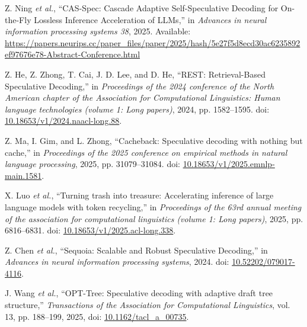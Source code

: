\documentclass[11pt,a4paper,UTF8,fontset=none,scheme=plain,zihao=-4]{ctexart}
\newenvironment{CSLReferences}[2]{%
  \footnotesize
  \raggedright
  \setlength{\leftskip}{3em}%
  \setlength{\parindent}{-3em}%
  \setlength{\parskip}{0.1\baselineskip}%
  \sloppy
}{}
\newcommand{\CSLLeftMargin}[1]{\makebox[3em][l]{#1}}
\newcommand{\CSLRightInline}[1]{#1}
\begin{document}
\begin{CSLReferences}{0}{0}
\leavevmode{}%
\CSLLeftMargin{{[}31{]} }
\CSLRightInline{Z. Ning \emph{et al.}, {``{CAS-Spec: Cascade Adaptive
Self-Speculative Decoding for On-the-Fly Lossless Inference Acceleration
of LLMs},''} in \emph{Advances in neural information processing systems
38}, 2025. Available:
\url{https://papers.neurips.cc/paper_files/paper/2025/hash/5e27f5d8ecd30ac6235892ef97676e78-Abstract-Conference.html}}

\leavevmode{}%
\CSLLeftMargin{{[}32{]} }
\CSLRightInline{Z. He, Z. Zhong, T. Cai, J. D. Lee, and D. He, {``{REST:
Retrieval-Based Speculative Decoding},''} in \emph{Proceedings of the
2024 conference of the {N}orth {A}merican chapter of the {A}ssociation
for {C}omputational {L}inguistics: Human language technologies (volume
1: Long papers)}, 2024, pp. 1582--1595. doi:
\href{https://doi.org/10.18653/v1/2024.naacl-long.88}{10.18653/v1/2024.naacl-long.88}.}

\leavevmode{}%
\CSLLeftMargin{{[}33{]} }
\CSLRightInline{Z. Ma, I. Gim, and L. Zhong, {``Cacheback: Speculative
decoding with nothing but cache,''} in \emph{Proceedings of the 2025
conference on empirical methods in natural language processing}, 2025,
pp. 31079--31084. doi:
\href{https://doi.org/10.18653/v1/2025.emnlp-main.1581}{10.18653/v1/2025.emnlp-main.1581}.}

\leavevmode{}%
\CSLLeftMargin{{[}34{]} }
\CSLRightInline{X. Luo \emph{et al.}, {``Turning trash into treasure:
Accelerating inference of large language models with token recycling,''}
in \emph{Proceedings of the 63rd annual meeting of the association for
computational linguistics (volume 1: Long papers)}, 2025, pp.
6816--6831. doi:
\href{https://doi.org/10.18653/v1/2025.acl-long.338}{10.18653/v1/2025.acl-long.338}.}

\leavevmode{}%
\CSLLeftMargin{{[}35{]} }
\CSLRightInline{Z. Chen \emph{et al.}, {``{Sequoia: Scalable and Robust
Speculative Decoding},''} in \emph{Advances in neural information
processing systems}, 2024. doi:
\href{https://doi.org/10.52202/079017-4116}{10.52202/079017-4116}.}

\leavevmode{}%
\CSLLeftMargin{{[}36{]} }
\CSLRightInline{J. Wang \emph{et al.}, {``{OPT-Tree}: Speculative
decoding with adaptive draft tree structure,''} \emph{Transactions of
the Association for Computational Linguistics}, vol. 13, pp. 188--199,
2025, doi:
\href{https://doi.org/10.1162/tacl_a_00735}{10.1162/tacl\_a\_00735}.}


\end{CSLReferences}
\end{document}
